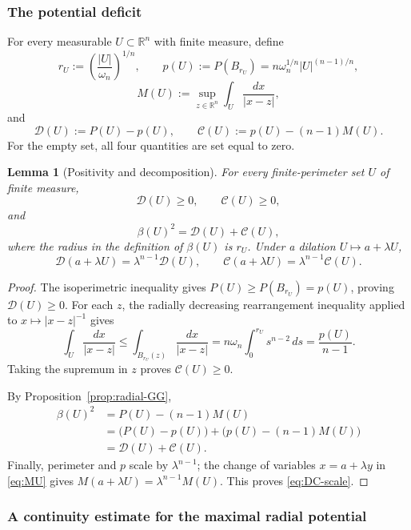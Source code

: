 \documentclass[11pt]{amsart}
\newtheorem{lemma}[theorem]{Lemma}
\theoremstyle{definition}
\newcommand{\R}{\mathbb R}
\newcommand{\Per}{P}
\newcommand{\Def}{\mathcal D}
\begin{document}
\subsubsection{The potential deficit}

For every measurable \(U\subset\R^n\) with finite measure, define
\[
   r_U:=\left(\frac{|U|}{\omega_n}\right)^{1/n},
   \qquad
   p(U):=\Per(B_{r_U})
          =n\omega_n^{1/n}|U|^{(n-1)/n},
\tag{4.2}\label{eq:pU}
\]
\[
   M(U):=\sup_{z\in\R^n}\int_U\frac{dx}{|x-z|},
\tag{4.3}\label{eq:MU}
\]
and
\[
   \Def(U):=\Per(U)-p(U),\qquad
   \mathcal C(U):=p(U)-(n-1)M(U).
\tag{4.4}\label{eq:DC-general}
\]
For the empty set, all four quantities are set equal to zero.

\begin{lemma}[Positivity and decomposition]\label{lem:C-decomposition}
For every finite-perimeter set \(U\) of finite measure,
\[
   \Def(U)\ge0,\qquad \mathcal C(U)\ge0,
\tag{4.5}\label{eq:DC-positive}
\]
and
\[
   \beta(U)^2=\Def(U)+\mathcal C(U),
\tag{4.6}\label{eq:beta-DC}
\]
where the radius in the definition of \(\beta(U)\) is \(r_U\).
Under a dilation \(U\mapsto a+\lambda U\),
\[
   \Def(a+\lambda U)=\lambda^{n-1}\Def(U),\qquad
   \mathcal C(a+\lambda U)=\lambda^{n-1}\mathcal C(U).
\tag{4.7}\label{eq:DC-scale}
\]
\end{lemma}

\begin{proof}
The isoperimetric inequality gives
\(\Per(U)\ge\Per(B_{r_U})=p(U)\), proving \(\Def(U)\ge0\).
For each \(z\), the radially decreasing rearrangement inequality applied to
\(x\mapsto |x-z|^{-1}\) gives
\[
   \int_U\frac{dx}{|x-z|}
   \le\int_{B_{r_U}(z)}\frac{dx}{|x-z|}
   =n\omega_n\int_0^{r_U}s^{n-2}\,ds
   =\frac{p(U)}{n-1}.
\]
Taking the supremum in \(z\) proves \(\mathcal C(U)\ge0\).

By Proposition~\ref{prop:radial-GG},
\[
\begin{aligned}
   \beta(U)^2
   &=\Per(U)-(n-1)M(U) \\
   &=\bigl(\Per(U)-p(U)\bigr)
     +\bigl(p(U)-(n-1)M(U)\bigr) \\
   &=\Def(U)+\mathcal C(U).
\end{aligned}
\]
Finally, perimeter and \(p\) scale by \(\lambda^{n-1}\); the change of
variables \(x=a+\lambda y\) in \eqref{eq:MU} gives
\(M(a+\lambda U)=\lambda^{n-1}M(U)\).  This proves
\eqref{eq:DC-scale}.
\end{proof}

\subsubsection{A continuity estimate for the maximal radial potential}
\end{document}
